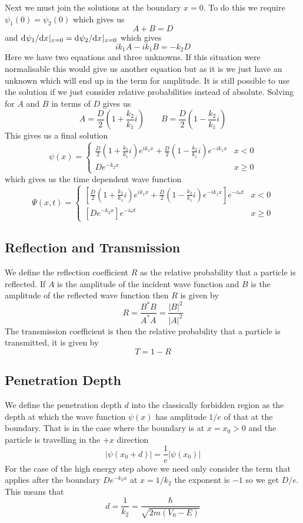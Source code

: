 \documentclass{article}
\begin{document}
    Next we must join the solutions at the boundary \(x = 0\).
    To do this we require \(\psi_1(0) = \psi_2(0)\) which gives us
    \[A + B = D\]
    and \(\mathrm{d}^{}{\psi_1}/\mathrm{d}{x}^{}|_{x=0} = \mathrm{d}^{}{\psi_2}/\mathrm{d}{x}^{}|_{x = 0}\) which gives
    \[ik_1A - ik_1B = -k_2 D\]
    Here we have two equations and three unknowns.
    If this situation were normalisable this would give us another equation but as it is we just have an unknown which will end up in the term for amplitude.
    It is still possible to use the solution if we just consider relative probabilities instead of absolute.
    Solving for \(A\) and \(B\) in terms of \(D\) gives us
    \[A = \frac{D}{2}\left(1 + \frac{k_2}{k_1}i\right) \qquad B = \frac{D}{2}\left(1 - \frac{k_2}{k_1}i\right)\]
    This gives us a final solution
    \[
        \psi(x) = 
        \begin{cases}
            \frac{D}{2}\left(1 + \frac{k_2}{k_1}i\right)e^{ik_1x} + \frac{D}{2}\left(1 - \frac{k_2}{k_1}i\right)e^{-ik_1x} & x < 0\\
            De^{-k_2x} & x \ge 0
        \end{cases}
    \]
    which gives us the time dependent wave function
    \[
        \Psi(x, t) = 
        \begin{cases}
            \left[\frac{D}{2}\left(1 + \frac{k_2}{k_1}i\right)e^{ik_1x} + \frac{D}{2}\left(1 - \frac{k_2}{k_1}i\right)e^{-ik_1x}\right]e^{-i\omega t} & x < 0\\
            \left[De^{-k_2x}\right]e^{-i\omega t} & x \ge 0
        \end{cases}
    \]
    \subsection{Reflection and Transmission}
    We define the reflection coefficient \(R\) as the relative probability that a particle is reflected.
    If \(A\) is the amplitude of the incident wave function and \(B\) is the amplitude of the reflected wave function then \(R\) is given by
    \[R = \frac{B^*B}{A^*A} = \frac{|B|^2}{|A|^2}\]
    The transmission coefficient is then the relative probability that a particle is transmitted, it is given by
    \[T = 1 - R\]
    
    \subsection{Penetration Depth}
    We define the penetration depth \(d\) into the classically forbidden region as the depth at which the wave function \(\psi(x)\) has amplitude \(1/e\) of that at the boundary.
    That is in the case where the boundary is at \(x = x_0 > 0\) and the particle is travelling in the \(+x\) direction
    \[|\psi(x_0 + d)| = \frac{1}{e}|\psi(x_0)|\]
    For the case of the high energy step above we need only consider the term that applies after the boundary \(De^{-k_2x}\) at \(x = 1/k_2\) the exponent is \(-1\) so we get \(D/e\).
    This means that
    \[d = \frac{1}{k_2} = \frac{\hbar}{\sqrt{2m(V_0 - E)}}\]
    
\end{document}

